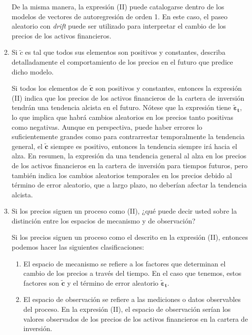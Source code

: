 \begin{problema}
\begin{enumerate}
\begin{sol}
        De la misma manera, la expresión (II) puede catalogarse dentro de los modelos de vectores de autoregresión de orden 1. En este caso, el  paseo aleatorio con \textit{drift} puede ser utilizado para interpretar el cambio de los precios de los activos financieros. 
    \end{sol}
    \item Si $\tilde{c}$ es tal que todos sus elementos son positivos y constantes, describa detalladamente el comportamiento de los precios en el futuro que predice dicho modelo.
    \begin{sol}
        Si todos los elementos de $\tilde{\boldsymbol{c}}$ son positivos y constantes, entonces la expresión (II) indica que los precios de los activos financieros de la cartera de inversión tendrán una tendencia alcista en el futuro.\bigbreak
        Nótese que la expresión tiene $\tilde{\boldsymbol{\varepsilon}}_{\mathbf{t}}$, lo que implica que habrá cambios aleatorios en los precios tanto positivas como negativas. Aunque  en perspectiva, puede haber errores lo suficientemente grandes como para contrarrestar temporalmente la tendencia general, el   $\tilde{\boldsymbol{c}}$ siempre es positivo, entonces la tendencia siempre irá hacia el alza. \bigbreak 
        En resumen, la expresión da una tendencia general al alza en los precios de los activos financieros en la cartera de inversión para tiempos futuros, pero también indica los cambios aleatorios temporales en los precios debido al término de error aleatorio, que a largo plazo, no deberían afectar la tendencia alcista.
    \end{sol}
    \item Si los precios siguen un proceso como (II), ¿qué puede decir usted sobre la distinción entre los espacios de mecanismo y de observación?
    \begin{sol}
        Si los precios siguen un proceso como el descrito en la expresión (II), entonces podemos hacer las siguientes clasificaciones: 
        \begin{enumerate}
            \item El espacio de mecanismo se refiere a los factores que determinan el cambio de los precios a través del tiempo. En el caso que tenemos, estos factores son $\tilde{\boldsymbol{c}}$ y el término de error aleatorio $\tilde{\boldsymbol{\varepsilon}}_{\mathbf{t}}$.
            \item El espacio de observación se refiere a las mediciones o datos observables del proceso. En la expresión (II), el espacio de observación serían los valores observados de los precios de los activos financieros en la cartera de inversión.

\end{enumerate}
\end{sol}
\end{enumerate}
\end{problema}

